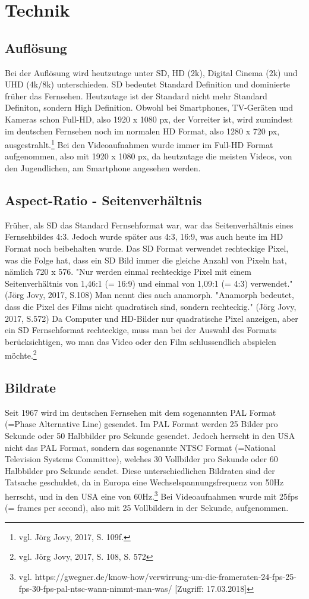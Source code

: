 \section{Technik}
\subsection{Auflösung}
Bei der Auflösung wird heutzutage unter SD, HD (2k), Digital Cinema (2k) und UHD (4k/8k) unterschieden. SD bedeutet Standard Definition und dominierte früher das Fernsehen. Heutzutage ist der Standard nicht mehr Standard Definiton, sondern High Definition. Obwohl bei Smartphones, TV-Geräten und Kameras schon Full-HD, also 1920 x 1080 px, der Vorreiter ist, wird zumindest im deutschen Fernsehen noch im normalen HD Format, also 1280 x 720 px, ausgestrahlt.\footnote{\label{}vgl. Jörg Jovy, 2017, S. 109f.}\newline
Bei den Videoaufnahmen wurde immer im Full-HD Format aufgenommen, also mit 1920 x 1080 px, da heutzutage die meisten Videos, von den Jugendlichen, am Smartphone angesehen werden.
\subsection{Aspect-Ratio - Seitenverhältnis}
Früher, als SD das Standard Fernsehformat war, war das Seitenverhältnis eines Fernsehbildes 4:3. Jedoch wurde später aus 4:3, 16:9, was auch heute im HD Format noch beibehalten wurde. Das SD Format verwendet rechteckige Pixel, was die Folge hat, dass ein SD Bild immer die gleiche Anzahl von Pixeln hat, nämlich 720 x 576. "Nur werden einmal rechteckige Pixel mit einem Seitenverhältnis von 1,46:1 (= 16:9) und einmal von 1,09:1 (= 4:3) verwendet." (Jörg Jovy, 2017, S.108)\newline 
Man nennt dies auch anamorph. "Anamorph bedeutet, dass die Pixel des Films nicht quadratisch sind, sondern rechteckig." (Jörg Jovy, 2017, S.572)\newline
Da Computer und HD-Bilder nur quadratische Pixel anzeigen, aber ein SD Fernsehformat rechteckige, muss man bei der Auswahl des Formats berücksichtigen, wo man das Video oder den Film schlussendlich abspielen möchte.\footnote{\label{}vgl. Jörg Jovy, 2017, S. 108, S. 572}
\subsection{Bildrate}
Seit 1967 wird im deutschen Fernsehen mit dem sogenannten PAL Format (=Phase Alternative Line) gesendet. Im PAL Format werden 25 Bilder pro Sekunde oder 50 Halbbilder pro Sekunde gesendet. Jedoch herrscht in den USA nicht das PAL Format, sondern das sogenannte NTSC Format (=National Television Systems Committee), welches 30 Vollbilder pro Sekunde oder 60 Halbbilder pro Sekunde sendet. Diese unterschiedlichen Bildraten sind der Tatsache geschuldet, da in Europa eine Wechselspannungsfrequenz von 50Hz herrscht, und in den USA eine von 60Hz.\footnote{\label{}vgl. https://gwegner.de/know-how/verwirrung-um-die-frameraten-24-fps-25-fps-30-fps-pal-ntsc-wann-nimmt-man-was/ [Zugriff: 17.03.2018]}\newline
Bei Videoaufnahmen wurde mit 25fps (= frames per second), also mit 25 Vollbildern in der Sekunde, aufgenommen.
